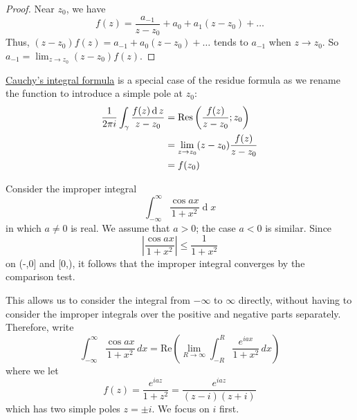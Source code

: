 \documentclass[12pt]{article}
\renewcommand{\d}{\ensuremath{\operatorname{d}}}
\begin{document}
\begin{proof}
    Near $z_0$, we have \[f(z) = \frac{a_{-1}}{z-z_0}+a_0+a_1(z-z_0)+\dots\]
    Thus, $(z-z_0)f(z)=a_{-1}+a_0(z-z_0)+\dots$ tends to $a_{-1}$ when $z\to z_0$. So $a_{-1}=\lim_{z\to z_0}(z-z_0)f(z)$.
\end{proof}

\rmk \hyperlink{cauchys-integral-formula}{Cauchy's integral formula} is a special case of the residue formula as we rename the function to introduce a simple pole at $z_0$: \begin{align*}
    \frac{1}{2\pi i}\int_{\gamma}\frac{f(z)\d z}{z-z_0} &= \Res\left(\frac{f(z)}{z-z_0};z_0\right)\\
    &= \lim_{z\to z_0}(z-z_0)\frac{f(z)}{z-z_0}\\
    &=f(z_0)
\end{align*}

\eg Consider the improper integral
\[\int_{-\infty}^{\infty}{\frac{\cos a x}{1+x^{2}}}\d x\]
in which $a \neq 0$ is real. We assume that $a > 0$; the case $a < 0$ is similar. Since\[\left|\frac{\cos a x}{1+x^{2}}\right|\leq \frac{1}{1+x^{2}}\] on (-\infty,0] and [0,\infty), it follows that the improper integral converges by the comparison test. 

This allows us to consider the integral from $-\infty$ to $\infty$ directly, without having to consider the improper integrals over the positive and negative parts separately. Therefore, write \[\int_{-\infty}^{\infty}\frac{\cos a x}{1+x^{2}}\,d x=\mathrm{Re}\left(\operatorname*{lim}_{R\rightarrow\infty}\int_{-R}^{R}\frac{e^{i a x}}{1+x^{2}}\,d x\right)
\] where we let \[f(z)=\frac{e^{i a z}}{1+z^{2}}=\frac{e^{i a z}}{(z-i)(z+i)}\]
which has two simple poles $z=\pm i$. We focus on $i$ first.
\end{document}

